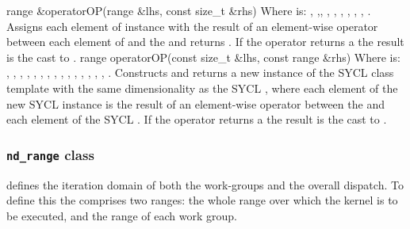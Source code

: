  \addRow
    { range \&operatorOP(range \&lhs, const size_t \&rhs) }
    {
      Where  is: \codeinline{+=}, \codeinline{-=},\codeinline{
      *=}, \codeinline{/=}, \codeinline{\%=}, \codeinline{<<=}, \codeinline{
      >>=}, \codeinline{\&=}, \codeinline{|=}, \codeinline{^=}.
      \newline
      Assigns each element of   instance with the
      result of an element-wise  operator between each element
      of   and the   and returns  . If the
      operator returns a  the result is the cast to
      .
    }
  \addRow
    { range operatorOP(const size_t \&lhs, const range \&rhs) }
    {
      Where  is: \codeinline{+}, \codeinline{-}, \codeinline{*},
      \codeinline{/}, \codeinline{\%}, \codeinline{<<}, \codeinline{>>},
      \codeinline{\&}, \codeinline{|}, \codeinline{^},
      \codeinline{\&\&}, \codeinline{||},
      \codeinline{<}, \codeinline{>}, \codeinline{<=},
      \codeinline{>=}.
      \newline
      Constructs and returns a new instance of the SYCL  class
      template with the same dimensionality as the  SYCL
      , where each element of the new SYCL 
      instance is the result of an element-wise  operator between
      the   and each element of the
       SYCL . If the operator returns a
       the result is the cast to .
    }
\completeTable


\subsubsection{\texttt{nd_range} class}
\label{subsubsec:nd-range-class}


 defines the iteration domain of both
the work-groups and the overall dispatch. To define this the
 comprises two ranges: the whole range over which
the kernel is to be executed, and the range of each work
group.

